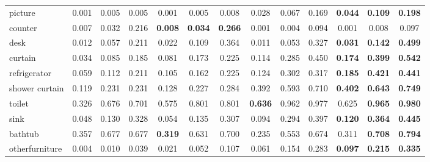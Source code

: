 \documentclass[10pt,twocolumn,letterpaper]{article}
\begin{document}
\begin{table*}[ht!]
{\begin{tabular}{l|ccc|ccc|ccc|ccc}
picture        &         0.001  &         0.005  &         0.005  &         0.001  &         0.005  &         0.008  &         0.028  &         0.067  &         0.169  & \textbf{0.044} & \textbf{0.109} & \textbf{0.198} \\
counter        &         0.007  &         0.032  &         0.216  & \textbf{0.008} & \textbf{0.034} & \textbf{0.266} &         0.001  &         0.004  &         0.094  &         0.001  &         0.008  &         0.097  \\
desk           &         0.012  &         0.057  &         0.211  &         0.022  &         0.109  &         0.364  &         0.011  &         0.053  &         0.327  & \textbf{0.031} & \textbf{0.142} & \textbf{0.499} \\
curtain        &         0.034  &         0.085  &         0.185  &         0.081  &         0.173  &         0.225  &         0.114  &         0.285  &         0.450  & \textbf{0.174} & \textbf{0.399} & \textbf{0.542} \\
refrigerator   &         0.059  &         0.112  &         0.211  &         0.105  &         0.162  &         0.225  &         0.124  &         0.302  &         0.317  & \textbf{0.185} & \textbf{0.421} & \textbf{0.441} \\
shower curtain &         0.119  &         0.231  &         0.231  &         0.128  &         0.227  &         0.284  &         0.392  &         0.593  &         0.710  & \textbf{0.402} & \textbf{0.643} & \textbf{0.749} \\
toilet         &         0.326  &         0.676  &         0.701  &         0.575  &         0.801  &         0.801  & \textbf{0.636} &         0.962  &         0.977  &         0.625  & \textbf{0.965} & \textbf{0.980} \\
sink           &         0.048  &         0.130  &         0.328  &         0.054  &         0.135  &         0.307  &         0.094  &         0.294  &         0.397  & \textbf{0.120} & \textbf{0.364} & \textbf{0.445} \\
bathtub        &         0.357  &         0.677  &         0.677  & \textbf{0.319} &         0.631  &         0.700  &         0.235  &         0.553  &         0.674  &         0.311  & \textbf{0.708} & \textbf{0.794} \\
otherfurniture &         0.004  &         0.010  &         0.039  &         0.021  &         0.052  &         0.107  &         0.061  &         0.154  &         0.283  & \textbf{0.097} & \textbf{0.215} & \textbf{0.335} \\

\end{tabular}}
\end{table*}
\end{document}
